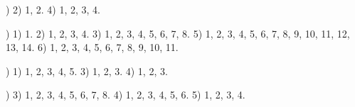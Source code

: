 \documentclass[a4paper,11pt]{article}
\begin{document}
\vspace{\spaceFour}



\noindent
{}) 2) 1, 2. 4) 1, 2, 3, 4.

\vspace{\spaceFour}



\noindent
{}) 1) 1. 2) 1, 2, 3, 4. 3) 1, 2, 3, 4, 5, 6, 7, 8. 5) 1,
2, 3, 4, 5, 6, 7, 8, 9, 10, 11, 12, 13, 14. 6) 1, 2, 3, 4, 5, 6, 7, 8,
9, 10, 11.

\vspace{\spaceFour}



\noindent
{}) 1) 1, 2, 3, 4, 5. 3) 1, 2, 3. 4) 1, 2, 3.

\vspace{\spaceFour}



\noindent
{}) 3) 1, 2, 3, 4, 5, 6, 7, 8. 4) 1, 2, 3, 4, 5, 6. 5) 1,
2, 3, 4.

\vspace{\spaceFour}















{}






\end{document}

